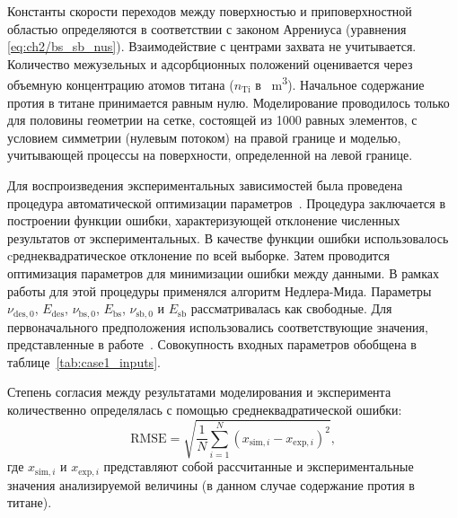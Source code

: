 
Константы скорости переходов между поверхностью и приповерхностной областью определяются в соответствии с законом Аррениуса (уравнения \cref{eq:ch2/bs_sb_nus}). Взаимодействие с центрами захвата не учитывается. Количество межузельных и адсорбционных положений оценивается через объемную концентрацию атомов титана ($n_\mathrm{Ti}$ в \si{\per\meter\cubed}). Начальное содержание протия в титане принимается равным нулю. Моделирование проводилось только для половины геометрии на сетке, состоящей из 1000 равных элементов, с условием симметрии (нулевым потоком) на правой границе и моделью, учитывающей процессы на поверхности, определенной на левой границе.

Для воспроизведения экспериментальных зависимостей была проведена процедура автоматической оптимизации параметров~\cite{Delaporte-Mathurin2021}. Процедура заключается в построении функции ошибки, характеризующей отклонение численных результатов от экспериментальных. В качестве функции ошибки использовалось cреднеквадратическое отклонение по всей выборке. Затем проводится оптимизация параметров для минимизации ошибки между данными. В рамках работы для этой процедуры применялся алгоритм Недлера-Мида. Параметры $\nu_\mathrm{des,0}$, $E_\mathrm{des}$, $\nu_\mathrm{bs,0}$, $E_\mathrm{bs}$, $\nu_\mathrm{sb,0}$ и $E_\mathrm{sb}$ рассматривалась как свободные. Для первоначального предположения использовались соответствующие значения, представленные в работе~\cite{Shimohata2021}. Совокупность входных параметров обобщена в таблице~\cref{tab:case1_inputs}.

Степень согласия между результатами моделирования и эксперимента количественно определялась с помощью среднеквадратической ошибки:
\begin{equation}
    \mathrm{RMSE} = \sqrt{\dfrac{1}{N} \sum \limits_{i=1}^N(x_{\mathrm{sim},i}-x_{\mathrm{exp},i})^2},
\end{equation}
где $x_{\mathrm{sim},i}$ и $x_{\mathrm{exp},i}$ представляют собой рассчитанные и экспериментальные значения анализируемой величины (в данном случае содержание протия в титане).

